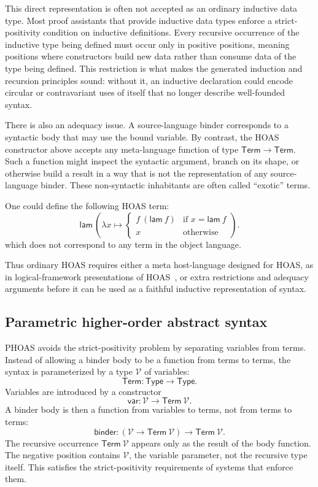 This direct representation is often not accepted as an ordinary inductive data type.
Most proof assistants that provide inductive data types enforce a strict-positivity condition on inductive definitions.
Every recursive occurrence of the inductive type being defined must occur only in positive positions, meaning positions where constructors build new data rather than consume data of the type being defined.
This restriction is what makes the generated induction and recursion principles sound: without it, an inductive declaration could encode circular or contravariant uses of itself that no longer describe well-founded syntax.

There is also an adequacy issue.
A source-language binder corresponds to a syntactic body that may use the bound variable.
By contrast, the HOAS constructor above accepts any meta-language function of type \(\mathsf{Term} \to \mathsf{Term}\).
Such a function might inspect the syntactic argument, branch on its shape, or otherwise build a result in a way that is not the representation of any source-language binder.
These non-syntactic inhabitants are often called ``exotic'' terms.
\begin{example}
One could define the following HOAS term:
\[
  \mathsf{lam}\,
    \left(\lambda x ↦
      \begin{cases}
        f\ (\mathsf{lam}\ f) & \text{if } x = \mathsf{lam}\ f\\
        x & \text{otherwise}
      \end{cases}
    \right).
\]
which does not correspond to any term in the object language.
\end{example}
Thus ordinary HOAS requires either a meta host-language designed for HOAS, as in logical-framework presentations of HOAS~\cite{pfenning1988hoas}, or extra restrictions and adequacy arguments before it can be used as a faithful inductive representation of syntax.

\subsection{Parametric higher-order abstract syntax}

PHOAS avoids the strict-positivity problem by separating variables from terms.
Instead of allowing a binder body to be a function from terms to terms, the syntax is parameterized by a type \(\mathcal V\) of variables:
\[
  \mathsf{Term} : \mathsf{Type} \to \mathsf{Type}.
\]
Variables are introduced by a constructor
\[
  \mathsf{var} : \mathcal V \to \mathsf{Term}\ \mathcal V.
\]
A binder body is then a function from variables to terms, not from terms to terms:
\[
  \mathsf{binder} :
    (\mathcal V \to \mathsf{Term}\ \mathcal V)
    \to \mathsf{Term}\ \mathcal V.
\]
The recursive occurrence \(\mathsf{Term}\ \mathcal V\) appears only as the result of the body function.
The negative position contains \(\mathcal V\), the variable parameter, not the recursive type itself.
This satisfies the strict-positivity requirements of systems that enforce them.

